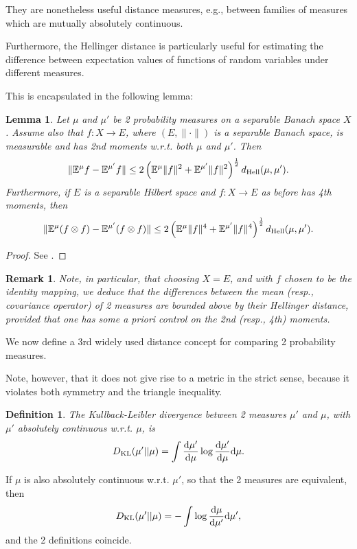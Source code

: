 \documentclass[oneside,11pt]{book}
\numberwithin{equation}{section}
\newtheorem{lemma}{Lemma}[section]
\newtheorem{definition}{Definition}[section]
\newtheorem{remark}{Remark}[section]
\begin{document}
They are nonetheless useful distance measures, e.g., between families of measures which are mutually absolutely continuous.

Furthermore, the Hellinger distance is particularly useful for estimating the difference between expectation values of functions of random variables under different measures.

This is encapsulated in the following lemma:

\begin{lemma}
    Let $\mu$ and $\mu'$ be 2 probability measures on a separable Banach space $X$. Assume also that $f:X\to E$, where $(E,\|\cdot\|)$ is a separable Banach space, is measurable and has 2nd moments w.r.t. both $\mu$ and $\mu'$. Then
    \begin{align*}
        \|\mathbb{E}^\mu f - \mathbb{E}^{\mu'}f\|\le 2\left(\mathbb{E}^\mu\|f\|^2 + \mathbb{E}^{\mu'}\|f\|^2\right)^{\frac{1}{2}}d_{\rm Hell}(\mu,\mu').
    \end{align*}
    Furthermore, if $E$ is a separable Hilbert space and $f:X\to E$ as before has 4th moments, then
    \begin{align*}
        \|\mathbb{E}^\mu(f\otimes f) - \mathbb{E}^{\mu'}(f\otimes f)\|\le 2\left(\mathbb{E}^\mu\|f\|^4 + \mathbb{E}^{\mu'}\|f\|^4\right)^{\frac{1}{2}}d_{\rm Hell}(\mu,\mu').
    \end{align*}
\end{lemma}

\begin{proof}
    See \cite[p. 410]{Dashti_Stuart2017}.
\end{proof}

\begin{remark}
    Note, in particular, that choosing $X = E$, and with $f$ chosen to be the identity mapping, we deduce that the differences between the mean (resp., covariance operator) of 2 measures are bounded above by their Hellinger distance, provided that one has some a priori control on the 2nd (resp., 4th) moments.
\end{remark}
We now define a 3rd widely used distance concept for comparing 2 probability measures.

Note, however, that it does not give rise to a metric in the strict sense, because it violates both symmetry and the triangle inequality.

\begin{definition}
    The \emph{Kullback-Leibler divergence} between 2 measures $\mu'$ and $\mu$, with $\mu'$ absolutely continuous w.r.t. $\mu$, is
    \begin{align*}
        D_{\rm KL}(\mu'||\mu) = \int \frac{{\rm d}\mu'}{{\rm d}\mu}\log\frac{{\rm d}\mu'}{{\rm d}\mu}{\rm d}\mu.
    \end{align*}
\end{definition}
If $\mu$ is also absolutely continuous w.r.t. $\mu'$, so that the 2 measures are equivalent, then
\begin{align*}
    D_{\rm KL}(\mu'||\mu) = -\int \log\frac{{\rm d}\mu}{{\rm d}\mu'}{\rm d}\mu',
\end{align*}
and the 2 definitions coincide.
\end{document}
